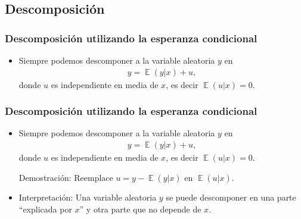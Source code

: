 \documentclass[t, compress, spanish, aspectratio=169]{beamer}
\DeclareMathOperator{\E}{\mathbb{E}}
\begin{document}
    \subsection{Descomposici\'on}
    \begin{frame}
        \frametitle{Descomposici\'on utilizando la esperanza condicional}
        \begin{itemize}
            \item <1-> Siempre podemos descomponer a la variable aleatoria $y$ en
            \begin{align*}
            y = \E(y|x) + u,
            \end{align*}
            donde $u$ es independiente en media de $x$, es decir $\E(u|x)=0$.
        \end{itemize}            
    \end{frame}
    
    \begin{frame}
        \frametitle{Descomposici\'on utilizando la esperanza condicional}
        \begin{itemize}
            \item <1-> Siempre podemos descomponer a la variable aleatoria $y$ en
            \begin{align*}
            y = \E(y|x) + u,
            \end{align*}
            donde $u$ es independiente en media de $x$, es decir $\E(u|x)=0$.
            
            \bigskip
            
            Demostraci\'on: Reemplace $u=y-\E(y|x)$ en $\E(u|x)$.
            
            \bigskip
            
            \item <1-> Interpretaci\'on: Una variable aleatoria $y$ se puede descomponer en una parte ``explicada por $x$'' y otra parte que no depende de $x$.
        \end{itemize}
    \end{frame}
    
\end{document}
